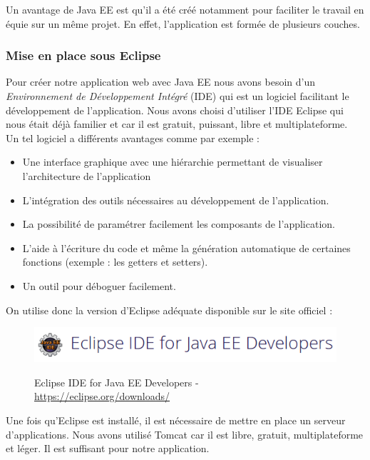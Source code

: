 Un avantage de Java EE est qu'il a été créé notamment pour faciliter le travail en équie sur un même projet. En effet, l'application est formée de plusieurs couches.\\

\subsubsection{Mise en place sous Eclipse}
Pour créer notre application web avec Java EE nous avons besoin d'un \textit{Environnement de Développement Intégré} (IDE) qui est un logiciel facilitant le développement de l'application. Nous avons choisi d'utiliser l'IDE Eclipse qui nous était déjà familier et car il est gratuit, puissant, libre et multiplateforme.\\
Un tel logiciel a différents avantages comme par exemple :
\begin{itemize}
 \item Une interface graphique avec une hiérarchie permettant de visualiser l'architecture de l'application
 \item L'intégration des outils nécessaires au développement de l'application.
 \item La possibilité de paramétrer facilement les composants de l'application.
 \item L'aide à l'écriture du code et même la génération automatique de certaines fonctions (exemple : les getters et setters).
 \item Un outil pour déboguer facilement.
\end{itemize}

On utilise donc la version d'Eclipse adéquate disponible sur le site officiel :
\begin{figure}[H]
  \center
  \includegraphics[scale=0.5]{../graph/eclipse.png} \\
  \caption{Eclipse IDE for Java EE Developers - \url{https://eclipse.org/downloads/}}
\end{figure}

Une fois qu'Eclipse est installé, il est nécessaire de mettre en place un serveur d'applications. Nous avons utilisé Tomcat car il est libre, gratuit, multiplateforme et léger. Il est suffisant pour notre application.

